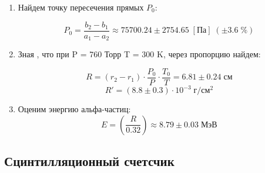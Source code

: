 \documentclass[a4paper]{article}
\begin{document}
\begin{enumerate}
    
    \item Найдем точку пересечения прямых $P_0$:

    $$P_0 = \frac{b_2 - b_1}{a_1 - a_2} \approx 75700.24 \pm 2754.65 \; [Па] \; (\pm 3.6 \; \%)$$


    \item Зная , что при P = 760 Торр T = 300 K, через пропорцию найдем:

    $$R = (r_2-r_1) \cdot \frac{P_0}{P} \cdot \frac{T_0}{T} = 6.81 \pm 0.24 \; см$$
    $$R' = (8.8 \pm 0.3) \cdot 10^{-3} \; г/см^2$$


    \item Оценим энергию альфа-частиц:
    $$E = \left ( \frac{R}{0.32} \right ) \approx 8.79 \pm 0.03 \; МэВ$$
\end{enumerate}



\subsection{Сцинтилляционный счетсчик}
\end{document}
